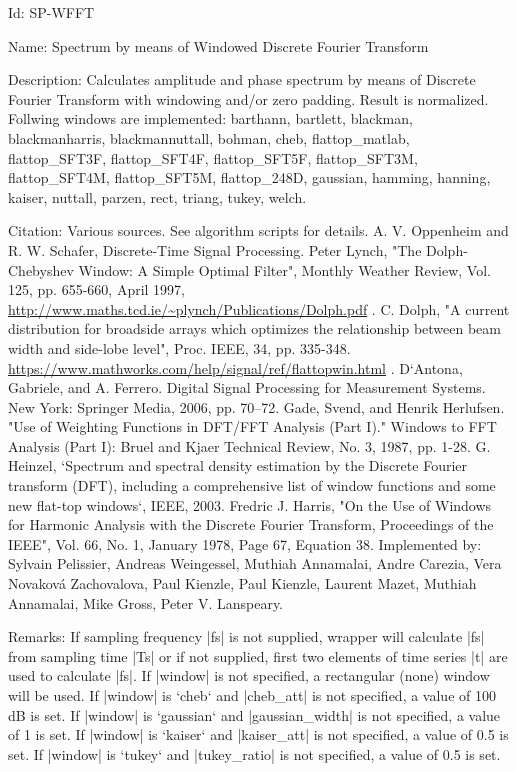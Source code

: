 \begin{tightdesc}
\item [Id:] SP-WFFT
\item [Name:] Spectrum by means of Windowed Discrete Fourier Transform
\item [Description:] Calculates amplitude and phase spectrum by means of Discrete Fourier Transform with windowing and/or zero padding. Result is normalized. Follwing windows are implemented: barthann, bartlett, blackman, blackmanharris, blackmannuttall, bohman, cheb, flattop\_matlab, flattop\_SFT3F, flattop\_SFT4F, flattop\_SFT5F, flattop\_SFT3M, flattop\_SFT4M, flattop\_SFT5M, flattop\_248D, gaussian, hamming, hanning, kaiser, nuttall, parzen, rect, triang, tukey, welch.
\item [Citation:]  Various sources. See algorithm scripts for details. A. V. Oppenheim and R. W. Schafer, Discrete-Time Signal Processing. Peter Lynch, "The Dolph-Chebyshev Window: A Simple Optimal Filter", Monthly Weather Review, Vol. 125, pp. 655-660, April 1997, \url{http://www.maths.tcd.ie/~plynch/Publications/Dolph.pdf} . C. Dolph, "A current distribution for broadside arrays which optimizes the relationship between beam width and side-lobe level", Proc. IEEE, 34, pp. 335-348. \url{https://www.mathworks.com/help/signal/ref/flattopwin.html} . D`Antona, Gabriele, and A. Ferrero. Digital Signal Processing for Measurement Systems. New York: Springer Media, 2006, pp. 70–72. Gade, Svend, and Henrik Herlufsen. "Use of Weighting Functions in DFT/FFT Analysis (Part I)." Windows to FFT Analysis (Part I): Bruel and Kjaer Technical Review, No. 3, 1987, pp. 1-28. G. Heinzel, `Spectrum and spectral density estimation by the Discrete Fourier transform (DFT), including a comprehensive list of window functions and some new flat-top windows`, IEEE, 2003. Fredric J. Harris, "On the Use of Windows for Harmonic Analysis with the Discrete Fourier Transform, Proceedings of the IEEE", Vol. 66, No. 1, January 1978, Page 67, Equation 38. Implemented by: Sylvain Pelissier, Andreas Weingessel, Muthiah Annamalai, Andre Carezia, Vera Novaková Zachovalova, Paul Kienzle, Paul Kienzle, Laurent Mazet, Muthiah Annamalai, Mike Gross, Peter V. Lanspeary.
\item [Remarks:] If sampling frequency |fs| is not supplied, wrapper will calculate |fs| from sampling time |Ts| or if not supplied, first two elements of time series |t| are used to calculate |fs|. If |window| is not specified, a rectangular (none) window will be used. If |window| is `cheb` and |cheb\_att| is not specified, a value of 100 dB is set. If |window| is `gaussian` and |gaussian\_width| is not specified, a value of 1 is set. If |window| is `kaiser` and |kaiser\_att| is not specified, a value of 0.5 is set. If |window| is `tukey` and |tukey\_ratio| is not specified, a value of 0.5 is set.

\end{tightdesc}
